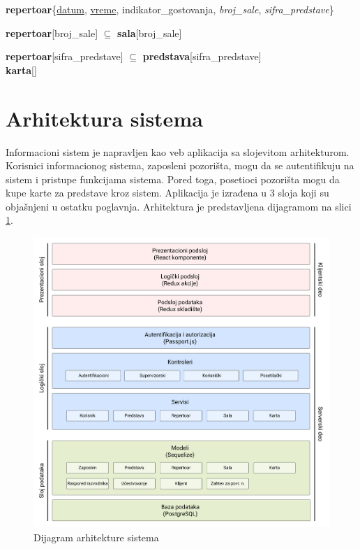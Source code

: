 \documentclass[a4paper]{article}
\begin{document}
\textbf{repertoar}\{\underline{datum}, \underline{vreme}, indikator\_gostovanja, 
  \textit{broj\_sale}, \textit{sifra\_predstave}\}

\textbf{repertoar}[broj\_sale] $\subseteq$ \textbf{sala}[broj\_sale]

\textbf{repertoar}[sifra\_predstave] $\subseteq$ \textbf{predstava}[sifra\_predstave]\\

\textbf{karta}[]


\section{Arhitektura sistema}
Informacioni sistem je napravljen kao veb aplikacija sa slojevitom arhitekturom. Korisnici informacionog sistema, zaposleni pozorišta, mogu da se autentifikuju na sistem i pristupe funkcijama sistema. Pored toga, posetioci pozorišta mogu da kupe karte za predstave kroz sistem. Aplikacija je izrađena u 3 sloja koji su objašnjeni u ostatku poglavnja. Arhitektura je predstavljena dijagramom na slici \ref{dijagram_arhitehture}.

\begin{figure}[H]
  \begin{center}
    \includegraphics[width=160mm]{../images/dijagram_arhitekture.png}
  \end{center}
  \caption{Dijagram arhitekture sistema}
  \label{dijagram_arhitehture}
\end{figure}
\end{document}
